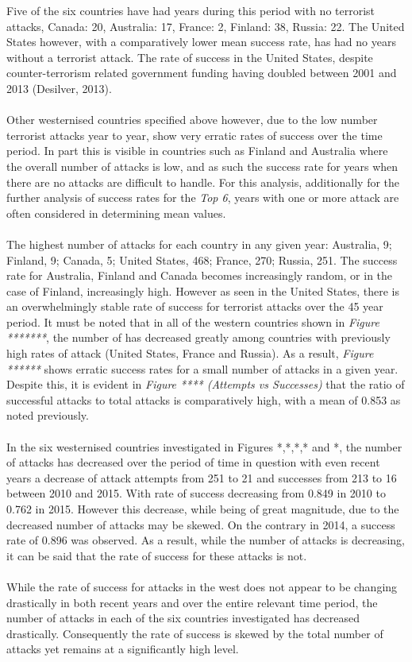\documentclass[10pt,a4paper]{article}
\begin{document}
Five of the six countries have had years during this period with no terrorist attacks, Canada: 20, Australia: 17, France: 2, Finland: 38, Russia: 22. The United States however, with a comparatively lower mean success rate, has had no years without a terrorist attack. The rate of success in the United States, despite counter-terrorism related government funding having doubled between 2001 and 2013 (Desilver, 2013).
\\\\
Other westernised countries specified above however, due to the low number terrorist attacks year to year, show very erratic rates of success over the time period.
In part this is visible in countries such as Finland and Australia where the overall number of attacks is low, and as such the success rate for years when there are no attacks are difficult to handle.
For this analysis, additionally for the further analysis of success rates for the \textit{Top 6}, years with one or more attack are often considered in determining mean values. 
\\\\
The highest number of attacks for each country in any given year: Australia, 9; Finland, 9; Canada, 5; United States, 468; France, 270; Russia, 251. The success rate for Australia, Finland and Canada becomes increasingly random, or in the case of Finland, increasingly high. However as seen in the United States, there is an overwhelmingly stable rate of success for terrorist attacks over the 45 year period. It must be noted that in all of the western countries shown in \textit{Figure *******}, the number of has decreased greatly among countries with previously high rates of attack (United States, France and Russia). As a result, \textit{Figure ******} shows erratic success rates for a small number of attacks in a given year. Despite this, it is evident in \textit{Figure **** (Attempts vs Successes)} that the ratio of successful attacks to total attacks is comparatively high, with a mean of 0.853 as noted previously.
\\\\
In the six westernised countries investigated in Figures *,*,*,* and *, the number of attacks has decreased over the period of time in question with even recent years a decrease of attack attempts from 251 to 21 and successes from 213 to 16 between 2010 and 2015. With rate of success decreasing from 0.849 in 2010 to 0.762 in 2015. However this decrease, while being of great magnitude, due to the decreased number of attacks may be skewed. On the contrary in 2014, a success rate of 0.896 was observed. As a result, while the number of attacks is decreasing, it can be said that the rate of success for these attacks is not.
\\\\
While the rate of success for attacks in the west does not appear to be changing drastically in both recent years and over the entire relevant time period, the number of attacks in each of the six countries investigated has decreased drastically. Consequently the rate of success is skewed by the total number of attacks yet remains at a significantly high level.
\end{document}
